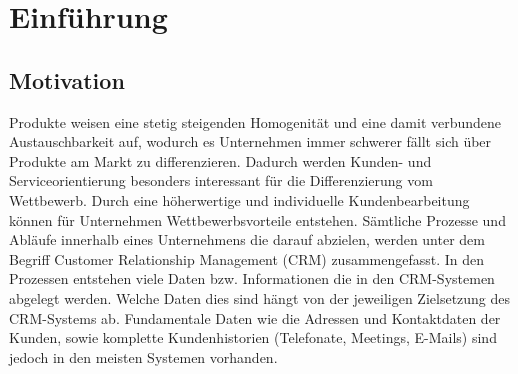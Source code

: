 \chapter{Einführung}
\label{ch:Einfuehrung}

\section{Motivation}
\label{ch:Einfuehrung:sec:Motivation}


Produkte weisen eine stetig steigenden Homogenität und eine damit verbundene Austauschbarkeit auf, wodurch es Unternehmen immer schwerer fällt sich über Produkte am Markt zu differenzieren. Dadurch werden Kunden- und Serviceorientierung besonders interessant für die Differenzierung vom Wettbewerb. Durch eine höherwertige und individuelle Kundenbearbeitung können für Unternehmen Wettbewerbsvorteile entstehen. Sämtliche Prozesse und Abläufe innerhalb eines Unternehmens die darauf abzielen, werden unter dem Begriff Customer Relationship Management (CRM) zusammengefasst. 
In den Prozessen entstehen viele Daten bzw. Informationen die in den CRM-Systemen abgelegt werden. Welche Daten dies sind hängt von der jeweiligen Zielsetzung des CRM-Systems ab. Fundamentale Daten wie die Adressen und Kontaktdaten der Kunden, sowie komplette Kundenhistorien (Telefonate, Meetings, E-Mails) sind jedoch in den meisten Systemen vorhanden. 

